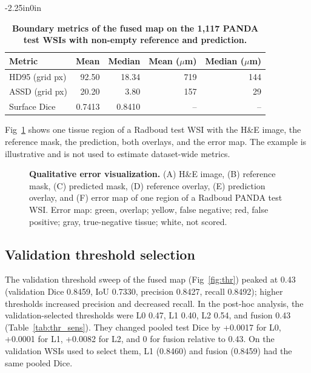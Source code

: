 \documentclass[10pt,letterpaper]{article}
\begin{document}
\begin{table}[H]\begin{adjustwidth}{-2.25in}{0in}\centering
\caption{\textbf{Boundary metrics of the fused map on the 1,117 PANDA test WSIs with non-empty reference and prediction.}}
\begin{tabular}{lrrrr}\toprule Metric & Mean & Median & Mean ($\mu$m) & Median ($\mu$m)\\\midrule
HD95 (grid px) & 92.50 & 18.34 & 719 & 144\\
ASSD (grid px) & 20.20 & 3.80 & 157 & 29\\
Surface Dice & 0.7413 & 0.8410 & -- & --\\
\bottomrule
\end{tabular}\label{tab:boundary}\end{adjustwidth}\end{table}

Fig~\ref{fig:good} shows one tissue region of a Radboud test WSI with the H\&E image, the reference mask, the prediction, both overlays, and the error map. The example is illustrative and is not used to estimate dataset-wide metrics.

\begin{figure}[H]
\centering
\caption{\textbf{Qualitative error visualization.} (A) H\&E image, (B) reference mask, (C) predicted mask, (D) reference overlay, (E) prediction overlay, and (F) error map of one region of a Radboud PANDA test WSI. Error map: green, overlap; yellow, false negative; red, false positive; gray, true-negative tissue; white, not scored.}
\label{fig:good}
\end{figure}

\subsection*{Validation threshold selection}
The validation threshold sweep of the fused map (Fig~\ref{fig:thr}) peaked at 0.43 (validation Dice 0.8459, IoU 0.7330, precision 0.8427, recall 0.8492); higher thresholds increased precision and decreased recall. In the post-hoc analysis, the validation-selected thresholds were L0 0.47, L1 0.40, L2 0.54, and fusion 0.43 (Table~\ref{tab:thr_sens}). They changed pooled test Dice by +0.0017 for L0, +0.0001 for L1, +0.0082 for L2, and 0 for fusion relative to 0.43. On the validation WSIs used to select them, L1 (0.8460) and fusion (0.8459) had the same pooled Dice.
\end{document}
